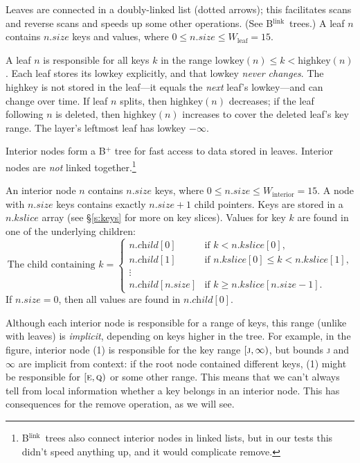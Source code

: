\documentclass[11pt]{article}
\newcommand{\V}[1]{\textit{#1}}
\newcommand{\N}[1]{\text{#1}}
\newcommand{\Blink}{B\(^{\text{link}}\)}
\newcommand{\LEAFWIDTH}{\ensuremath{W_\text{leaf}}}
\newcommand{\INTERIORWIDTH}{\ensuremath{W_\text{interior}}}
\begin{document}
Leaves are connected in a doubly-linked list (dotted arrows); this
facilitates scans and reverse scans and speeds up some other operations.
(See \Blink\ trees.) A leaf \(n\) contains \(n.\V{size}\) keys and
values, where \(0 \leq n.\V{size} \leq \LEAFWIDTH = 15\).

A leaf \(n\) is responsible for all keys \(k\) in the range
\(\N{lowkey}(n) \leq k < \N{highkey}(n)\). Each leaf stores its lowkey
explicitly, and that lowkey \emph{never changes}. The highkey is not
stored in the leaf---it equals the \emph{next} leaf's lowkey---and can
change over time. If leaf \(n\) splits, then \(\N{highkey}(n)\)
decreases; if the leaf following \(n\) is deleted, then
\(\N{highkey}(n)\) increases to cover the deleted leaf's key range. The
layer's leftmost leaf has lowkey \(-\infty\).

Interior nodes form a B$^+$ tree for fast access to data stored in
leaves. Interior nodes are \emph{not} linked
together.\footnote{\Blink\ trees also connect interior nodes in linked
lists, but in our tests this didn't speed anything up, and it would
complicate remove.}

An interior node \(n\) contains \(n.\V{size}\) keys, where \(0 \leq
n.\V{size} \leq \INTERIORWIDTH = 15\). A node with \(n.\V{size}\) keys
contains exactly \(n.\V{size} + 1\) child pointers. Keys are stored in a
\(n.\V{kslice}\) array (see \S\ref{s:keys} for more on key slices).
Values for key \(k\) are found in one of the underlying children:
%
\[
\text{The child containing \(k\)} =
\begin{cases}
n.\V{child}[0] & \text{if \(k < n.\V{kslice}[0]\),} \\
n.\V{child}[1] & \text{if \(n.\V{kslice}[0] \leq k < n.\V{kslice}[1]\),} \\
\vdots \\
n.\V{child}[n.\V{size}] & \text{if \(k \geq n.\V{kslice}[n.\V{size}-1]\).}
\end{cases}
\]
%
If \(n.\V{size} = 0\), then all values are found in \(n.\V{child}[0]\).

Although each interior node is responsible for a range of keys, this
range (unlike with leaves) is \emph{implicit}, depending on keys higher
in the tree. For example, in the figure, interior node (1) is
responsible for the key range \([\textsc{j}, \infty)\), but bounds
\textsc{j} and \(\infty\) are implicit from context: if the root node
contained different keys, (1) might be responsible for
\([\textsc{e},\textsc{q})\) or some other range. This means that we
can't always tell from local information whether a key belongs in an
interior node. This has consequences for the remove operation, as we
will see.
\end{document}
